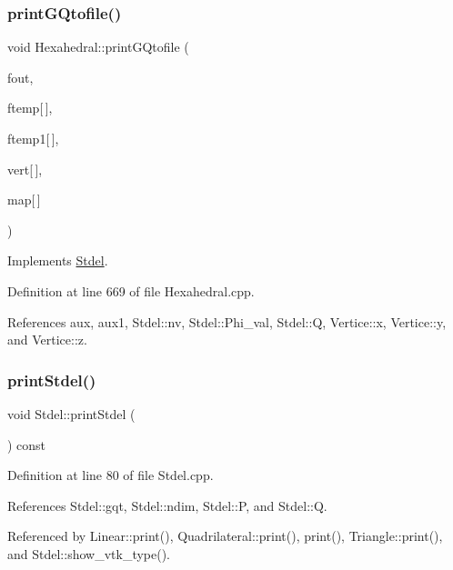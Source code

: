 \subsubsection{\texorpdfstring{print\+G\+Qtofile()}{printGQtofile()}}
{\footnotesize\ttfamily void Hexahedral\+::print\+G\+Qtofile (\begin{DoxyParamCaption}\item[{F\+I\+LE $\ast$}]{fout,  }\item[{const double}]{ftemp\mbox{[}$\,$\mbox{]},  }\item[{const double}]{ftemp1\mbox{[}$\,$\mbox{]},  }\item[{const \hyperlink{structVertice}{Vertice}}]{vert\mbox{[}$\,$\mbox{]},  }\item[{const int}]{map\mbox{[}$\,$\mbox{]} }\end{DoxyParamCaption})\hspace{0.3cm}{\ttfamily [virtual]}}



Implements \hyperlink{classStdel_a8196ddf2ec3c88627e33d19f93fdb354}{Stdel}.



Definition at line 669 of file Hexahedral.\+cpp.



References aux, aux1, Stdel\+::nv, Stdel\+::\+Phi\+\_\+val, Stdel\+::Q, Vertice\+::x, Vertice\+::y, and Vertice\+::z.

\mbox{\label{classStdel_a54b5768d09f500cb949e66fc234eac70}} 
\subsubsection{\texorpdfstring{print\+Stdel()}{printStdel()}}
{\footnotesize\ttfamily void Stdel\+::print\+Stdel (\begin{DoxyParamCaption}{ }\end{DoxyParamCaption}) const\hspace{0.3cm}{\ttfamily [inherited]}}



Definition at line 80 of file Stdel.\+cpp.



References Stdel\+::gqt, Stdel\+::ndim, Stdel\+::P, and Stdel\+::Q.



Referenced by Linear\+::print(), Quadrilateral\+::print(), print(), Triangle\+::print(), and Stdel\+::show\+\_\+vtk\+\_\+type().

